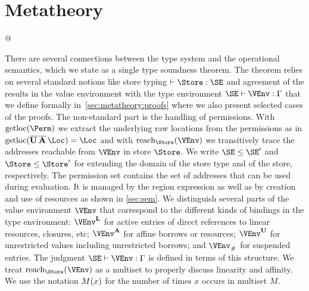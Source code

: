 \section{Metatheory}
\label{sec:metatheory}

\lstMakeShortInline[keepspaces,style=rule]@

There are several connections between the type system and
the operational semantics, which we state as a single type soundness
theorem.
%
The theorem relies on several standard notions like store typing
$\vdash \Store : \SE$ and agreement of the results in the value environment
with the type environment $\SE \vdash \VEnv:\E$ that we define
formally in~\cref{sec:metatheory:proofs} where we also present selected cases of the
proofs.
%
The non-standard part is the handling of permissions. With
$\Rawloc\Perm$ we extract the underlying raw locations from the
permissions as in $\Rawloc{\Multi\IBORROW\hspace{0.5mm}\Multi\MBORROW\hspace{0.5mm}\Loc} = \Loc$
and with $\Reach\Store\VEnv$ we transitively trace the
addresses reachable from $\VEnv$ in store $\Store$. We write
$\SE\le\SE'$ and $\Store \le \Store'$ for extending the domain of the
store type and of the store, respectively.
%
The permission set contains the set
of addresses that can be used during evaluation. It is managed by the
region expression as well as by creation and use of resources as
shown in \cref{sec:sem}.
%
We distinguish several parts of the value
environment $\VEnv$ that correspond to the different kinds of bindings in the
type environment: $\Active\VEnv$ for active entries of direct
references to linear resources, closures, etc; $\MutableBorrows\VEnv$ for
affine borrows or resources;
$\ImmutableBorrows\VEnv$ for unrestricted values including
unrestricted borrows;
and $\Suspended\VEnv$ for suspended entries. The judgment
$\SE \vdash \VEnv:\E$ is defined in terms of this structure.
We treat
$\Reach\Store\VEnv$ as a multiset to properly discuss linearity and
affinity. We use the notation $\MultiNumber x M$ for the number of
times $x$ occurs in multiset $M$.

